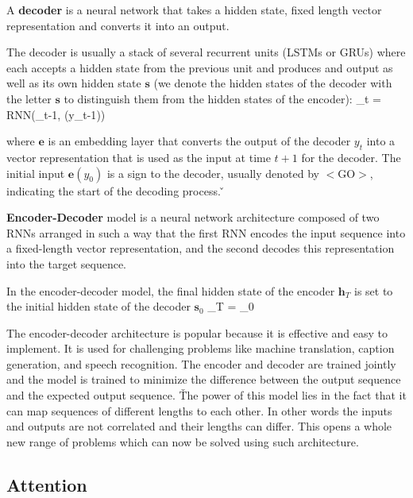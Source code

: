 
\bd[Decoder]
A \textbf{decoder} is a neural network that takes a hidden state, fixed length vector representation and converts it
into an output.
\ed

The decoder is usually a stack of several recurrent units (LSTMs or GRUs) where each accepts a hidden state from the
previous unit and produces and output as well as its own hidden state $\boldsymbol{s}$ (we denote the hidden states of
the decoder with the letter $\boldsymbol{s}$ to distinguish them from the hidden states of the encoder):
\bse
{}_{t} = RNN(_{t-1}, (y_{t-1}))
\ese

where $\boldsymbol{e}$ is an embedding layer that converts the output of the decoder $y_t$ into a vector representation
that is used as the input at time $t+1$ for the decoder. The initial input $\boldsymbol{e}(y_0)$ is a sign to the
decoder, usually denoted by $<\text{GO}>$, indicating the start of the decoding process. \v

\vspace{-10pt}

\textbf{Encoder-Decoder} model is a neural network architecture composed of two RNNs arranged in such a way that
the first RNN encodes the input sequence into a fixed-length vector representation, and the second decodes this
representation into the target sequence.
\ed

In the encoder-decoder model, the final hidden state of the encoder $\boldsymbol{h}_{T}$ is set to the initial hidden
state of the decoder $\boldsymbol{s}_{0}$
\bse
{}_{T} = _{0}
\ese


The encoder-decoder architecture is popular because it is effective and easy to implement. It is used for challenging
problems like machine translation, caption generation, and speech recognition. The encoder and decoder are trained
jointly and the model is trained to minimize the difference between the output sequence and the expected output
sequence. \v

The power of this model lies in the fact that it can map sequences of different lengths to each other. In other words
the inputs and outputs are not correlated and their lengths can differ. This opens a whole new range of problems
which can now be solved using such architecture.

\subsection{Attention}


